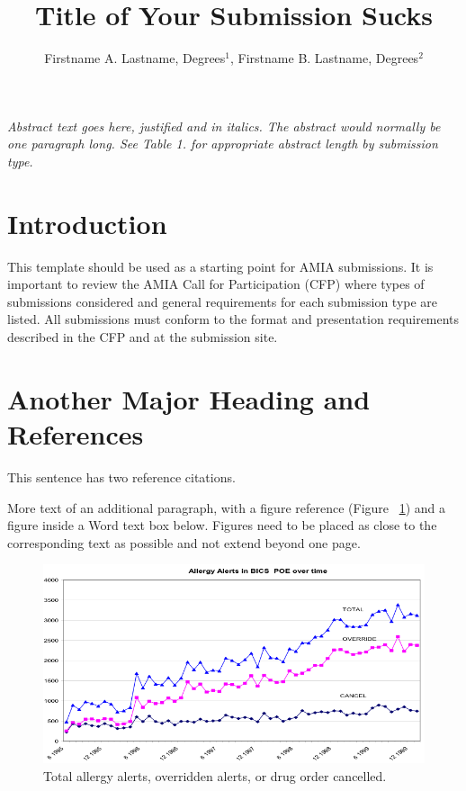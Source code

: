 \documentclass{amia}
\begin{document}
\title{Title of Your Submission Sucks}

\author{Firstname A. Lastname, Degrees$^{1}$, Firstname B. Lastname, Degrees$^{2}$}


\maketitle


\textit{Abstract text goes here, justified and in italics.  The abstract would normally be one paragraph long.  See Table 1. for appropriate abstract length by submission type.}

\section*{Introduction}
This template should be used as a starting point for AMIA submissions.  
It is important to review the AMIA Call for Participation (CFP) where types of submissions considered and general requirements for each submission type are listed. All submissions must conform to the format and presentation requirements described in the CFP and at the submission site.


\section*{Another Major Heading and References}
This sentence has two reference citations\cite{ref1,ref2}.

More text of an additional paragraph, with a figure reference (Figure ~\ref{fig1}) and a figure inside a Word text box below.  Figures need to be placed as close to the corresponding text as possible and not extend beyond one page.\\
\begin{figure}[h!]
	\centering
	\includegraphics[scale=1]{pics/figure1.png}
	\caption{Total allergy alerts, overridden alerts, or drug order cancelled.}
	\label{fig1}
\end{figure}
\end{document}
